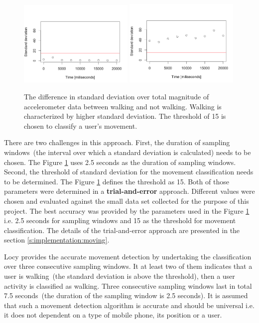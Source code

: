 \begin{figure}[H]
\centering
\includegraphics[width=0.49\textwidth, scale=0.6]{plots/stddev_no_walking}
\includegraphics[width=0.49\textwidth, scale=0.6]{plots/stddev_walking}
\caption{\label{p:moving:stddev} The difference in standard deviation over total magnitude of accelerometer data between walking and not walking. Walking is characterized by higher standard deviation. The threshold of 15 is chosen to classify a user's movement.}
\end{figure}

There are two challenges in this approach. First, the duration of sampling windows\ (the interval over which a standard deviation is calculated) needs to be chosen. The Figure \ref{p:moving:stddev} uses 2.5 seconds as the duration of sampling windows. Second, the threshold of standard deviation for the movement classification needs to be determined. The Figure \ref{p:moving:stddev} defines the threshold as 15. Both of those parameters were determined in a \textbf{trial-and-error} approach. Different values were chosen and evaluated against the small data set collected for the purpose of this project. The best accuracy was provided by the parameters used in the Figure \ref{p:moving:stddev} i.e. 2.5 seconds for sampling windows and 15 as the threshold for movement classification. The details of the trial-and-error approach are presented in the section \ref{s:implementation:moving}.

Locy provides the accurate movement detection by undertaking the classification over three consecutive sampling windows. It at least two of them indicates that a user is walking\ (the standard deviation is above the threshold), then a user activity is classified as walking. Three consecutive sampling windows last in total 7.5 seconds\ (the duration of the sampling window is 2.5 seconds). It is assumed that such a movement detection algorithm is accurate and should be universal i.e. it does not dependent on a type of mobile phone, its position or a user.

